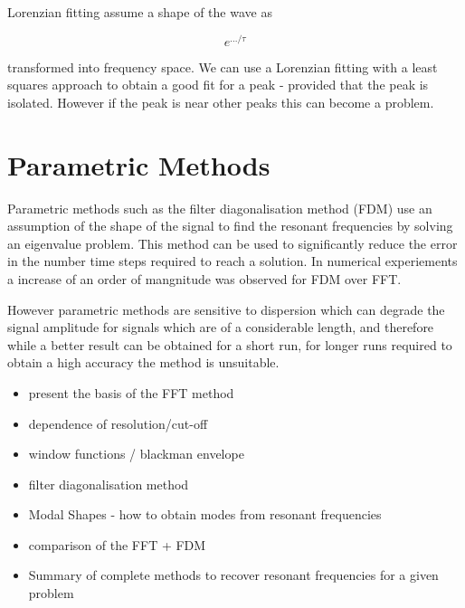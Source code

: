Lorenzian fitting assume a shape of the wave as

$$
e^{.../\tau}
$$

transformed into frequency space. We can use a Lorenzian fitting with a least
squares approach to obtain a good fit for a peak - provided that the peak is
isolated. However if the peak is near other peaks this can become a problem.


\section{Parametric Methods}

Parametric methods such as the filter diagonalisation method (FDM) use an
assumption of the shape of the signal to find the resonant frequencies by
solving an eigenvalue problem. This method can be used to significantly reduce
the error in the number time steps required to reach a solution. In numerical
experiements a increase of an order of mangnitude was observed for FDM over FFT.

However parametric methods are sensitive to dispersion which can degrade the
signal amplitude for signals which are of a considerable length, and therefore
while a better result can be obtained for a short run, for longer runs required
to obtain a high accuracy the method is unsuitable.

\begin{itemize}
  \item present the basis of the FFT method
  \item dependence of resolution/cut-off
	\item window functions / blackman envelope
	\item filter diagonalisation method
	\item Modal Shapes - how to obtain modes from resonant frequencies
  \item comparison of the FFT + FDM
  \item Summary of complete methods to recover resonant frequencies for a given
problem
\end{itemize}



